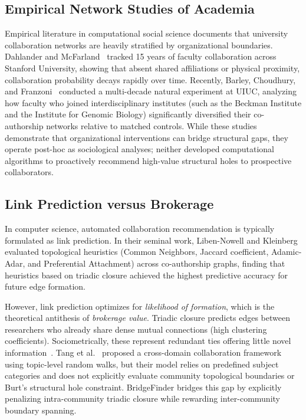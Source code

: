 \subsection{Empirical Network Studies of Academia}
Empirical literature in computational social science documents that university collaboration networks are heavily stratified by organizational boundaries. Dahlander and McFarland~\cite{dahlander2013} tracked 15 years of faculty collaboration across Stanford University, showing that absent shared affiliations or physical proximity, collaboration probability decays rapidly over time. Recently, Barley, Choudhury, and Franzoni~\cite{barley2025} conducted a multi-decade natural experiment at UIUC, analyzing how faculty who joined interdisciplinary institutes (such as the Beckman Institute and the Institute for Genomic Biology) significantly diversified their co-authorship networks relative to matched controls. While these studies demonstrate that organizational interventions can bridge structural gaps, they operate post-hoc as sociological analyses; neither developed computational algorithms to proactively recommend high-value structural holes to prospective collaborators.

\subsection{Link Prediction versus Brokerage}
In computer science, automated collaboration recommendation is typically formulated as link prediction. In their seminal work, Liben-Nowell and Kleinberg~\cite{libennowell2007} evaluated topological heuristics (Common Neighbors, Jaccard coefficient, Adamic-Adar, and Preferential Attachment) across co-authorship graphs, finding that heuristics based on triadic closure achieved the highest predictive accuracy for future edge formation. 

However, link prediction optimizes for \emph{likelihood of formation}, which is the theoretical antithesis of \emph{brokerage value}. Triadic closure predicts edges between researchers who already share dense mutual connections (high clustering coefficients). Sociometrically, these represent redundant ties offering little novel information~\cite{burt2004}. Tang et al.~\cite{tang2012} proposed a cross-domain collaboration framework using topic-level random walks, but their model relies on predefined subject categories and does not explicitly evaluate community topological boundaries or Burt's structural hole constraint. BridgeFinder bridges this gap by explicitly penalizing intra-community triadic closure while rewarding inter-community boundary spanning.

